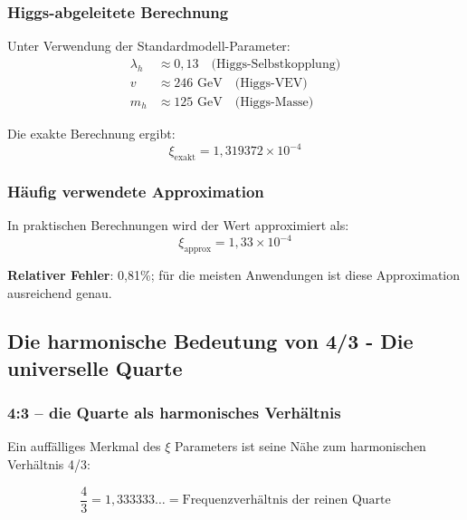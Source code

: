 	\subsubsection{Higgs-abgeleitete Berechnung}
	\label{subsubsec:higgs_berechnung}
	
	Unter Verwendung der Standardmodell-Parameter:
	\begin{align}
		\lambda_h &\approx 0{,}13 \quad \text{(Higgs-Selbstkopplung)} \\
		v &\approx 246 \text{ GeV} \quad \text{(Higgs-VEV)} \\
		m_h &\approx 125 \text{ GeV} \quad \text{(Higgs-Masse)}
	\end{align}
	
	Die exakte Berechnung ergibt:
	\begin{equation}
		\xi_{\text{exakt}} = 1{,}319372 \times 10^{-4}
		\label{eq:xi_exakt}
	\end{equation}
	
	\subsubsection{Häufig verwendete Approximation}
	\label{subsubsec:approximation}
	
	In praktischen Berechnungen wird der Wert approximiert als:
	\begin{equation}
		\xi_{\text{approx}} = 1{,}33 \times 10^{-4}
		\label{eq:xi_approx}
	\end{equation}
	
	\textbf{Relativer Fehler}: 0{,}81\%; für die meisten Anwendungen ist diese Approximation ausreichend genau.
	
	\subsection{Die harmonische Bedeutung von 4/3 - Die universelle Quarte}
	\label{subsec:vier_drittel_naehe}
	
	\subsubsection{4:3 -- die Quarte als harmonisches Verhältnis}
	\label{subsubsec:vier_drittel_verbindung}
	
	Ein auffälliges Merkmal des $\xi$ Parameters ist seine Nähe zum harmonischen Verhältnis 4/3:
	
	\begin{equation}
		\frac{4}{3} = 1{,}333333\ldots = \text{Frequenzverhältnis der reinen Quarte}
		\label{eq:vier_drittel}
	\end{equation}
	
